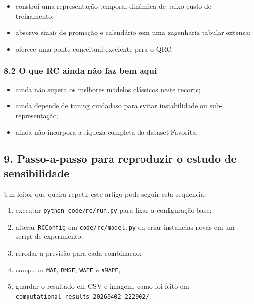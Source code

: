 \documentclass[12pt]{article}
\providecommand{\tightlist}{%
          \setlength{\itemsep}{0pt}\setlength{\parskip}{0pt}}
\begin{document}
\begin{itemize}
\tightlist
\item
  constroi uma representação temporal dinâmica de baixo custo de treinamento;
\item
  absorve sinais de promoção e calendário sem uma engenharia tabular extensa;
\item
  oferece uma ponte conceitual excelente para o QRC.
\end{itemize}

\subsubsection{8.2 O que RC ainda não faz bem aqui}\label{82-o-que-rc-ainda-nuxe3o-faz-bem-aqui}

\begin{itemize}
\tightlist
\item
  ainda não supera os melhores modelos clássicos neste recorte;
\item
  ainda depende de tuning cuidadoso para evitar instabilidade ou sub-representação;
\item
  ainda não incorpora a riqueza completa do dataset Favorita.
\end{itemize}

\subsection{9. Passo-a-passo para reproduzir o estudo de sensibilidade}\label{9-passo-a-passo-para-reproduzir-o-estudo-de-sensibilidade}

Um leitor que queira repetir este artigo pode seguir esta sequencia:

\begin{enumerate}
\def\labelenumi{\arabic{enumi}.}
\tightlist
\item
  executar \texttt{python\ code/rc/run.py} para fixar a configuração base;
\item
  alterar \texttt{RCConfig} em \texttt{code/rc/model.py} ou criar instancias novas em um script de experimento;
\item
  rerodar a previsão para cada combinacao;
\item
  comparar \texttt{MAE}, \texttt{RMSE}, \texttt{WAPE} e \texttt{sMAPE};
\item
  guardar o resultado em CSV e imagem, como foi feito em \texttt{computational\_results\_20260402\_222902/}.
\end{enumerate}
\end{document}
